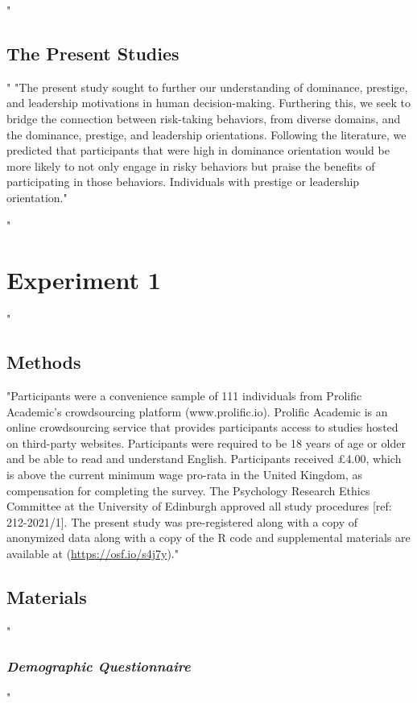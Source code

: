 \documentclass[
"  donotrepeattitle,doc, 12pt, a4paper,floatsintext]{apa7}"
\begin{document}
\hypertarget{the-present-studies}{%
"\subsection{The Present Studies}\label{the-present-studies}}"
"The present study sought to further our understanding of dominance, prestige, and leadership motivations in human decision-making. Furthering this, we seek to bridge the connection between risk-taking behaviors, from diverse domains, and the dominance, prestige, and leadership orientations. Following the literature, we predicted that participants that were high in dominance orientation would be more likely to not only engage in risky behaviors but praise the benefits of participating in those behaviors. Individuals with prestige or leadership orientation."
\hypertarget{experiment-1}{%
"\section{Experiment 1}\label{experiment-1}}"
\hypertarget{methods}{%
\subsection{Methods}\label{methods}}
"Participants were a convenience sample of 111 individuals from Prolific Academic's crowdsourcing platform (www.prolific.io). Prolific Academic is an online crowdsourcing service that provides participants access to studies hosted on third-party websites. Participants were required to be 18 years of age or older and be able to read and understand English. Participants received £4.00, which is above the current minimum wage pro-rata in the United Kingdom, as compensation for completing the survey. The Psychology Research Ethics Committee at the University of Edinburgh approved all study procedures {[}ref: 212-2021/1{]}. The present study was pre-registered along with a copy of anonymized data along with a copy of the R code and supplemental materials are available at (\url{https://osf.io/s4j7y})."
\hypertarget{materials}{%
\subsection{Materials}\label{materials}}
\hypertarget{demographic-questionnaire}{%
"\subsubsection{\texorpdfstring{\emph{Demographic Questionnaire}}{Demographic Questionnaire}}\label{demographic-questionnaire}}"
\end{document}

